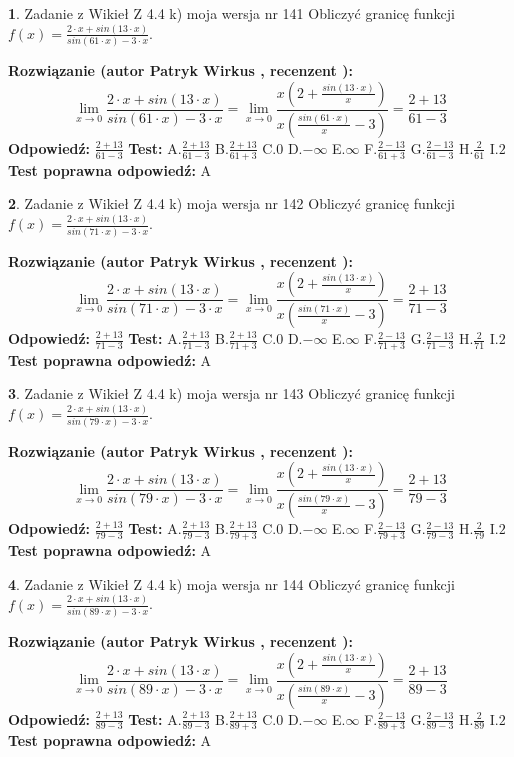 \documentclass[12pt, a4paper]{article}
\theoremstyle{definition} %
\newtheorem{zad}{}
\newcommand{\zadStart}[1]{\begin{zad}#1\newline}
\newcommand{\zadStop}{\end{zad}}
\newcommand{\rozwStart}[2]{\noindent \textbf{Rozwiązanie (autor #1 , recenzent #2): }\newline}
\newcommand{\rozwStop}{\newline}
\newcommand{\odpStart}{\noindent \textbf{Odpowiedź:}\newline}
\newcommand{\odpStop}{\newline}
\newcommand{\testStart}{\noindent \textbf{Test:}\newline}
\newcommand{\testStop}{\newline}
\newcommand{\kluczStart}{\noindent \textbf{Test poprawna odpowiedź:}\newline}
\newcommand{\kluczStop}{\newline}
\begin{document}
\zadStart{Zadanie z Wikieł Z 4.4 k) moja wersja nr 141}
Obliczyć granicę funkcji $f(x)=\frac{2\cdot x +sin(13\cdot x)}{sin(61\cdot x) -3\cdot x}$.
\zadStop
\rozwStart{Patryk Wirkus}{}
$$\lim\limits_{x\to 0}\frac{2\cdot x +sin(13\cdot x)}{sin(61\cdot x) -3\cdot x}
=\lim\limits_{x\to 0}\frac{x(2+\frac{sin(13\cdot x)}{x})}{x(\frac{sin(61\cdot x)}{x}-3)}
=\frac{2+13}{61-3}$$
\rozwStop
\odpStart
$\frac{2+13}{61-3}$
\odpStop
\testStart
A.$\frac{2+13}{61-3}$
B.$\frac{2+13}{61+3}$
C.$0$
D.$-\infty$
E.$\infty$
F.$\frac{2-13}{61+3}$
G.$\frac{2-13}{61-3}$
H.$\frac{2}{61}$
I.$2$
\testStop
\kluczStart
A
\kluczStop



\zadStart{Zadanie z Wikieł Z 4.4 k) moja wersja nr 142}
Obliczyć granicę funkcji $f(x)=\frac{2\cdot x +sin(13\cdot x)}{sin(71\cdot x) -3\cdot x}$.
\zadStop
\rozwStart{Patryk Wirkus}{}
$$\lim\limits_{x\to 0}\frac{2\cdot x +sin(13\cdot x)}{sin(71\cdot x) -3\cdot x}
=\lim\limits_{x\to 0}\frac{x(2+\frac{sin(13\cdot x)}{x})}{x(\frac{sin(71\cdot x)}{x}-3)}
=\frac{2+13}{71-3}$$
\rozwStop
\odpStart
$\frac{2+13}{71-3}$
\odpStop
\testStart
A.$\frac{2+13}{71-3}$
B.$\frac{2+13}{71+3}$
C.$0$
D.$-\infty$
E.$\infty$
F.$\frac{2-13}{71+3}$
G.$\frac{2-13}{71-3}$
H.$\frac{2}{71}$
I.$2$
\testStop
\kluczStart
A
\kluczStop



\zadStart{Zadanie z Wikieł Z 4.4 k) moja wersja nr 143}
Obliczyć granicę funkcji $f(x)=\frac{2\cdot x +sin(13\cdot x)}{sin(79\cdot x) -3\cdot x}$.
\zadStop
\rozwStart{Patryk Wirkus}{}
$$\lim\limits_{x\to 0}\frac{2\cdot x +sin(13\cdot x)}{sin(79\cdot x) -3\cdot x}
=\lim\limits_{x\to 0}\frac{x(2+\frac{sin(13\cdot x)}{x})}{x(\frac{sin(79\cdot x)}{x}-3)}
=\frac{2+13}{79-3}$$
\rozwStop
\odpStart
$\frac{2+13}{79-3}$
\odpStop
\testStart
A.$\frac{2+13}{79-3}$
B.$\frac{2+13}{79+3}$
C.$0$
D.$-\infty$
E.$\infty$
F.$\frac{2-13}{79+3}$
G.$\frac{2-13}{79-3}$
H.$\frac{2}{79}$
I.$2$
\testStop
\kluczStart
A
\kluczStop



\zadStart{Zadanie z Wikieł Z 4.4 k) moja wersja nr 144}
Obliczyć granicę funkcji $f(x)=\frac{2\cdot x +sin(13\cdot x)}{sin(89\cdot x) -3\cdot x}$.
\zadStop
\rozwStart{Patryk Wirkus}{}
$$\lim\limits_{x\to 0}\frac{2\cdot x +sin(13\cdot x)}{sin(89\cdot x) -3\cdot x}
=\lim\limits_{x\to 0}\frac{x(2+\frac{sin(13\cdot x)}{x})}{x(\frac{sin(89\cdot x)}{x}-3)}
=\frac{2+13}{89-3}$$
\rozwStop
\odpStart
$\frac{2+13}{89-3}$
\odpStop
\testStart
A.$\frac{2+13}{89-3}$
B.$\frac{2+13}{89+3}$
C.$0$
D.$-\infty$
E.$\infty$
F.$\frac{2-13}{89+3}$
G.$\frac{2-13}{89-3}$
H.$\frac{2}{89}$
I.$2$
\testStop
\kluczStart
A
\kluczStop
\end{document}
